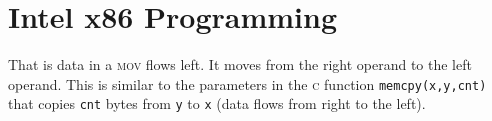 

\chapter{Intel x86 Programming}






That is data in a \textsc{mov} flows left. It moves from the right operand to the left operand.
This is similar to the parameters in the \textsc{c} function \lstinline{memcpy(x,y,cnt)} 
that copies \lstinline{cnt} bytes from \lstinline{y} to \lstinline{x} (data flows from right to the left). 